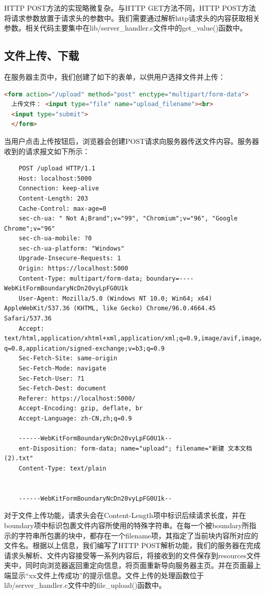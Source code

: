 \documentclass[a4paper]{article}
\begin{document}
HTTP POST方法的实现略微复杂。与HTTP GET方法不同，HTTP POST方法将请求参数放置于请求头的参数中。我们需要通过解析http请求头的内容获取相关参数。相关代码主要集中在lib/server\_handler.c文件中的get\_value()函数中。

\subsection{文件上传、下载}
在服务器主页中，我们创建了如下的表单，以供用户选择文件并上传：
\begin{lstlisting}[language=html]
  <form action="/upload" method="post" enctype="multipart/form-data">
  上传文件： <input type="file" name="upload_filename"><br>
  <input type="submit">
  </form>
\end{lstlisting}
当用户点击上传按钮后，浏览器会创建POST请求向服务器传送文件内容。服务器收到的请求报文如下所示：
\begin{lstlisting}
	POST /upload HTTP/1.1
	Host: localhost:5000
	Connection: keep-alive
	Content-Length: 203
	Cache-Control: max-age=0
	sec-ch-ua: " Not A;Brand";v="99", "Chromium";v="96", "Google Chrome";v="96"
	sec-ch-ua-mobile: ?0
	sec-ch-ua-platform: "Windows"
	Upgrade-Insecure-Requests: 1
	Origin: https://localhost:5000
	Content-Type: multipart/form-data; boundary=----WebKitFormBoundaryNcDn20vyLpFG0U1k
	User-Agent: Mozilla/5.0 (Windows NT 10.0; Win64; x64) AppleWebKit/537.36 (KHTML, like Gecko) Chrome/96.0.4664.45 Safari/537.36
	Accept: text/html,application/xhtml+xml,application/xml;q=0.9,image/avif,image/webp,image/apng,*/*; q=0.8,application/signed-exchange;v=b3;q=0.9
	Sec-Fetch-Site: same-origin
	Sec-Fetch-Mode: navigate
	Sec-Fetch-User: ?1
	Sec-Fetch-Dest: document
	Referer: https://localhost:5000/
	Accept-Encoding: gzip, deflate, br
	Accept-Language: zh-CN,zh;q=0.9

	------WebKitFormBoundaryNcDn20vyLpFG0U1k--
	ent-Disposition: form-data; name="upload"; filename="新建 文本文档 (2).txt"
	Content-Type: text/plain


	------WebKitFormBoundaryNcDn20vyLpFG0U1k--
\end{lstlisting}
对于文件上传功能，请求头会在Content-Length项中标识后续请求长度，并在boundary项中标识包裹文件内容所使用的特殊字符串。在每一个被boundary所指示的字符串所包裹的块中，都存在一个filename项，其指定了当前块内容所对应的文件名。根据以上信息，我们编写了HTTP POST解析功能，我们的服务器在完成请求头解析、文件内容接受等一系列内容后，将接收到的文件保存到resources文件夹中，同时向浏览器返回重定向信息，将页面重新导向服务器主页。并在页面最上端显示“xx文件上传成功”的提示信息。文件上传的处理函数位于lib/server\_handler.c文件中的file\_upload()函数中。
\end{document}
